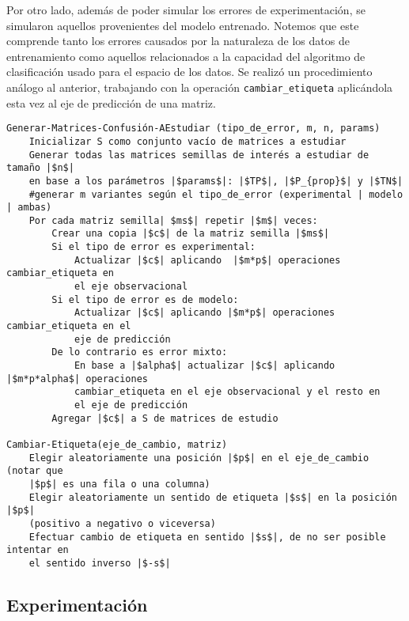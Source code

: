 Por otro lado, además de poder simular los errores de experimentación, se simularon aquellos provenientes del modelo entrenado. Notemos que este comprende tanto los errores causados por la naturaleza de los datos de entrenamiento como aquellos relacionados a la capacidad del algoritmo de clasificación usado para el espacio de los datos. Se realizó un procedimiento análogo al anterior, trabajando con la operación \texttt{cambiar\_etiqueta} aplicándola esta vez al eje de predicción de una matriz. 


\begin{verbatim}
Generar-Matrices-Confusión-AEstudiar (tipo_de_error, m, n, params)
    Inicializar S como conjunto vacío de matrices a estudiar
    Generar todas las matrices semillas de interés a estudiar de tamaño |$n$| 
    en base a los parámetros |$params$|: |$TP$|, |$P_{prop}$| y |$TN$|
    #generar m variantes según el tipo_de_error (experimental | modelo | ambas)
    Por cada matriz semilla| $ms$| repetir |$m$| veces:
        Crear una copia |$c$| de la matriz semilla |$ms$|
        Si el tipo de error es experimental:
            Actualizar |$c$| aplicando  |$m*p$| operaciones cambiar_etiqueta en 
            el eje observacional
        Si el tipo de error es de modelo:
            Actualizar |$c$| aplicando |$m*p$| operaciones cambiar_etiqueta en el
            eje de predicción
        De lo contrario es error mixto:
            En base a |$alpha$| actualizar |$c$| aplicando |$m*p*alpha$| operaciones
            cambiar_etiqueta en el eje observacional y el resto en 
            el eje de predicción
        Agregar |$c$| a S de matrices de estudio
        
Cambiar-Etiqueta(eje_de_cambio, matriz)
    Elegir aleatoriamente una posición |$p$| en el eje_de_cambio (notar que 
    |$p$| es una fila o una columna)
    Elegir aleatoriamente un sentido de etiqueta |$s$| en la posición |$p$| 
    (positivo a negativo o viceversa) 
    Efectuar cambio de etiqueta en sentido |$s$|, de no ser posible intentar en 
    el sentido inverso |$-s$|
\end{verbatim}

\subsection{Experimentación}

